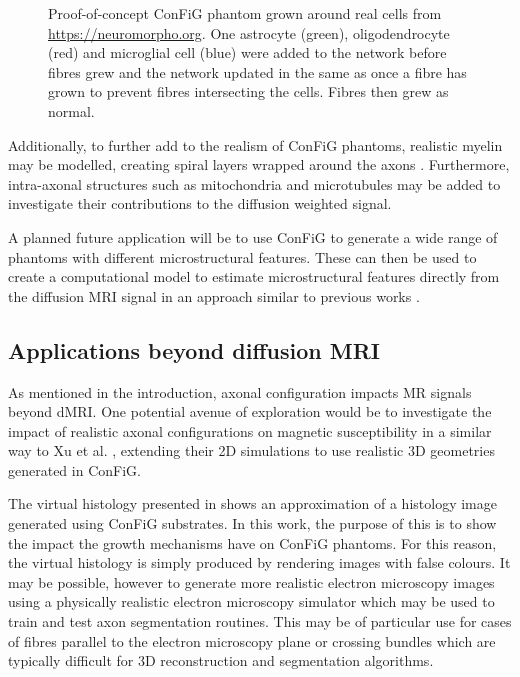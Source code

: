 \begin{figure}
\begin{subfigure}[]{0.49\textwidth}
  \end{subfigure}
  \caption[Proof-of-concept \acs{ConFiG} phantoms with real cells]{Proof-of-concept \ac{ConFiG} phantom grown around real cells from \url{https://neuromorpho.org}. One astrocyte (green), oligodendrocyte (red) and microglial cell (blue) were added to the network before fibres grew and the network updated in the same as once a fibre has grown to prevent fibres intersecting the cells. Fibres then grew as normal.}
  \label{fig:config_with_cells}
\end{figure}

Additionally, to further add to the realism of \ac{ConFiG} phantoms, realistic myelin may be modelled, creating spiral layers wrapped around the axons \cite{Brusini2019}. Furthermore, intra-axonal structures such as mitochondria and microtubules may be added to investigate their contributions to the diffusion weighted signal.

A planned future application will be to use \ac{ConFiG} to generate a wide range of phantoms with different microstructural features. These can then be used to create a computational model to estimate microstructural features directly from the diffusion \ac{MRI} signal in an approach similar to previous works \cite{Hill2019,Palombo2018a,Palombo2016,Nedjati-Gilani2017,Rensonnet2018}.

\subsection*{Applications beyond diffusion \ac{MRI}}
\label{sec:config_beyond_dmri}
As mentioned in the introduction, axonal configuration impacts MR signals beyond \ac{dMRI}. One potential avenue of exploration would be to investigate the impact of realistic axonal configurations on magnetic susceptibility in a similar way to Xu et al. \cite{Xu2018}, extending their 2D simulations to use realistic 3D geometries generated in \ac{ConFiG}.

The virtual histology presented in  shows an approximation of a histology image generated using \ac{ConFiG} substrates. In this work, the purpose of this is to show the impact the growth mechanisms have on \ac{ConFiG} phantoms. For this reason, the virtual histology is simply produced by rendering images with false colours. It may be possible, however to generate more realistic electron microscopy images using a physically realistic electron microscopy simulator \cite{Ophus2017,Grella2003,Babin2010} which may be used to train and test axon segmentation routines. This may be of particular use for cases of fibres parallel to the electron microscopy plane or crossing bundles which are typically difficult for 3D reconstruction and segmentation algorithms.

